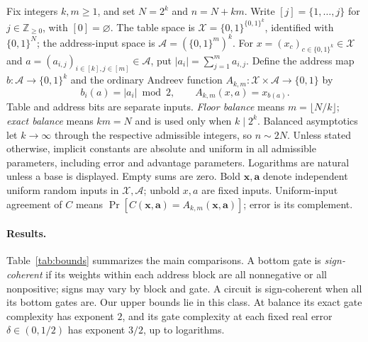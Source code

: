 \documentclass[11pt]{article}
\newcommand{\bits}{\{0,1\}}
\begin{document}
Fix integers $k,m\ge1$, and set $N=2^k$ and $n=N+km$.
Write $[j]=\{1,\ldots,j\}$ for $j\in\mathbb Z_{\ge0}$, with $[0]=\varnothing$.
The table space is $\mathcal X=\bits^{\bits^k}$, identified with $\bits^N$;
the address-input space is $\mathcal A=(\bits^m)^k$.
For $x=(x_c)_{c\in\bits^k}\in\mathcal X$ and
$a=(a_{i,j})_{i\in[k],j\in[m]}\in\mathcal A$, put
$|a_i|=\sum_{j=1}^m a_{i,j}$. Define the address map
$b:\mathcal A\to\bits^k$ and the ordinary Andreev function
$A_{k,m}:\mathcal X\times\mathcal A\to\bits$ by
$$
b_i(a)=|a_i|\bmod2,\qquad A_{k,m}(x,a)=x_{b(a)}.
$$
Table and address bits are separate inputs.
\emph{Floor balance} means $m=\lfloor N/k\rfloor$;
\emph{exact balance} means $km=N$ and is used only when $k\mid2^k$.
Balanced asymptotics let $k\to\infty$ through the respective admissible
integers, so $n\sim2N$. Unless stated otherwise, implicit constants are
absolute and uniform in all admissible parameters, including error and
advantage parameters. Logarithms are natural unless a base is displayed.
Empty sums are zero. Bold $\boldsymbol{x},\boldsymbol{a}$ denote independent
uniform random inputs in $\mathcal X,\mathcal A$; unbold $x,a$ are fixed
inputs. Uniform-input agreement of $C$ means
$\Pr[C(\boldsymbol{x},\boldsymbol{a})=A_{k,m}(\boldsymbol{x},\boldsymbol{a})]$;
error is its complement.

\paragraph{Results.}
Table~\ref{tab:bounds} summarizes the main comparisons.
A bottom gate is \emph{sign-coherent} if its weights within each address
block are all nonnegative or all nonpositive; signs may vary by block and
gate. A circuit is sign-coherent when all its bottom gates are.
Our upper bounds lie in this class. At balance its exact gate complexity
has exponent $2$, and its gate complexity at each fixed real error
$\delta\in(0,1/2)$ has exponent $3/2$, up to logarithms.
\end{document}
